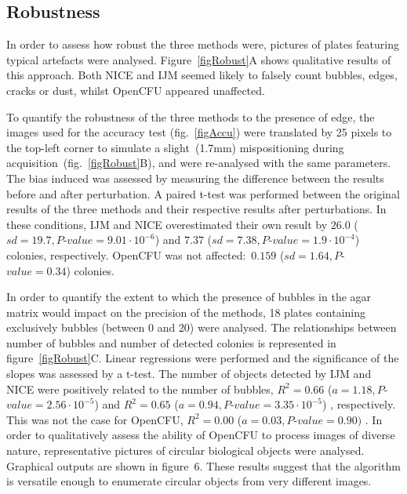 \documentclass[10pt]{article}
\newcommand{\IJM}{IJM}
\newcommand{\EdgeNoiseOCFU}{$0.159$ ($sd=1.64, P$-$value=0.34$)}
\newcommand{\EdgeNoiseIJM}{$26.0$ ($sd=19.7, P$-$value=9.01\cdot 10^{-6}$)}
\newcommand{\EdgeNoiseNICE}{$7.37$ ($sd=7.38,P$-$value=1.9\cdot 10^{-4}$)}
\newcommand{\BubbleNoiseOCFU}{$R^2 = 0.00$ ($a=0.03, P$-$value=0.90)$ }
\newcommand{\BubbleNoiseNICE}{$R^2 = 0.65$ ($a=0.94, P$-$value=3.35\cdot 10^{-5}$) }
\newcommand{\BubbleNoiseIJM}{$R^2 = 0.66$ ($a=1.18, P$-$value=2.56\cdot 10^{-5}$) }
\begin{document}
\subsection*{Robustness} 
In order to assess how robust the three methods were,
pictures of plates featuring typical artefacts were analysed.
Figure~\ref{figRobust}A shows qualitative results of this approach.
Both NICE and \IJM{} seemed likely to falsely count bubbles, edges, cracks or
dust, whilst OpenCFU appeared unaffected.

To quantify the robustness of the three methods to the presence of edge, the
images used for the accuracy test (fig.~\ref{figAccu}) were translated by 25 pixels to the top-left
corner to simulate a slight~(1.7mm) mispositioning during
acquisition~(fig.~\ref{figRobust}B), and were re-analysed with the same
parameters.
The bias induced was assessed by measuring the difference between the results
before and after perturbation. A paired t-test was performed between the
original results of the three methods and their respective results after perturbations.
In these conditions, \IJM{} and NICE overestimated their own result by
\EdgeNoiseIJM{} and \EdgeNoiseNICE{} colonies, respectively. OpenCFU was not affected:~\EdgeNoiseOCFU{} colonies.

In order to quantify the extent to which the presence of bubbles in the agar matrix would impact on
the precision of the methods, 18 plates containing exclusively bubbles (between
0 and 20) were analysed. The relationships between number of bubbles and number
of detected colonies is represented in figure~\ref{figRobust}C. Linear
regressions were performed and the significance of the slopes was assessed by a
t-test. The number of objects detected by \IJM{} and NICE were positively
related to the number of bubbles, \BubbleNoiseIJM and \BubbleNoiseNICE, respectively.
This was not the case for OpenCFU, \BubbleNoiseOCFU.
In order to qualitatively assess the ability of OpenCFU to process images of diverse nature,
representative pictures of circular biological objects were analysed. 
Graphical outputs are shown 
in figure~6.
These results suggest
that the algorithm is versatile enough to 
enumerate circular objects from very different images.
\end{document}
